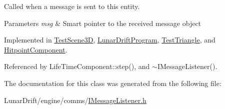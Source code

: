 Called when a message is sent to this entity. 


\begin{DoxyParams}{Parameters}
{\em msg} & Smart pointer to the received message object \\
\hline
\end{DoxyParams}


Implemented in \hyperlink{class_test_scene3_d_aa5c6527ffc929e51eb3303431bfc6f7d}{Test\+Scene3D}, \hyperlink{class_lunar_drift_program_a6586725d0267426dae45c7c5772cffc2}{Lunar\+Drift\+Program}, \hyperlink{class_test_triangle_ac5165e9e0ecdc4b232752b49c1ecbec0}{Test\+Triangle}, and \hyperlink{class_hitpoint_component_a86ab4e66b47a675b56c0c3eaa8ff07d9}{Hitpoint\+Component}.



Referenced by Life\+Time\+Component\+::step(), and $\sim$\+I\+Message\+Listener().



The documentation for this class was generated from the following file\+:\begin{DoxyCompactItemize}
\item 
Lunar\+Drift/engine/comms/\hyperlink{_i_message_listener_8h}{I\+Message\+Listener.\+h}\end{DoxyCompactItemize}
